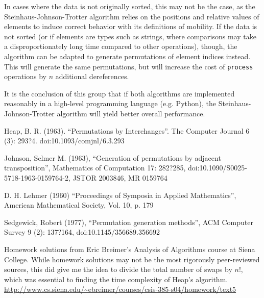 \documentclass[10pt, oneside]{article}   	%
\begin{document}
In cases where the data is not originally sorted, this may not be the case, as the Steinhaus-Johnson-Trotter algorithm relies on the positions and relative values of elements to induce correct behavior with its definitions of mobility. If the data is not sorted (or if elements are types such as strings, where comparisons may take a disproportionately long time compared to other operations), though, the algorithm can be adapted to generate permutations of element indices instead. This will generate the same permutations, but will increase the cost of \texttt{process} operations by $n$ additional dereferences.

It is the conclusion of this group that if both algorithms are implemented reasonably in a high-level programming language (e.g. Python), the Steinhaus-Johnson-Trotter algorithm will yield better overall performance.

\newpage
\begin{thebibliography}{9}
	Heap, B. R. (1963). ``Permutations by Interchanges''. The Computer Journal 6 (3): 293?4. doi:10.1093/comjnl/6.3.293
	
	Johnson, Selmer M. (1963), ``Generation of permutations by adjacent transposition'', Mathematics of Computation 17: 282?285, doi:10.1090/S0025-5718-1963-0159764-2, JSTOR 2003846, MR 0159764
	
	D. H. Lehmer (1960) ``Proceedings of Symposia in Applied Mathematics'', American Mathematical Society, Vol. 10, p. 179
	
	Sedgewick, Robert (1977), ``Permutation generation methods'', ACM Computer Survey 9 (2): 137?164, doi:10.1145/356689.356692


	Homework solutions from Eric Breimer's Analysis of Algorithms course at Siena College. While homework solutions may not be the most rigorously peer-reviewed sources, this did give me the idea to divide the total number of swaps by $n!$, which was essential to finding the time complexity of Heap's algorithm. \\
	\url{http://www.cs.siena.edu/~ebreimer/courses/csis-385-s04/homework/text5}

\end{thebibliography}
\end{document}
